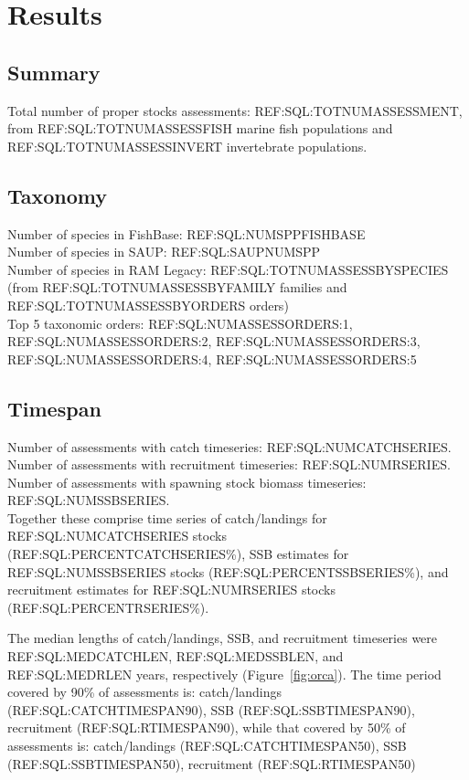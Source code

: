 \section*{Results}
\subsection*{Summary}
\noindent
Total number of proper stocks assessments: REF:SQL:TOTNUMASSESSMENT, from REF:SQL:TOTNUMASSESSFISH marine fish populations and REF:SQL:TOTNUMASSESSINVERT
invertebrate populations.

\subsection*{Taxonomy}
\noindent

Number of species in FishBase: REF:SQL:NUMSPPFISHBASE\\
Number of species in SAUP: REF:SQL:SAUPNUMSPP\\
Number of species in RAM Legacy: REF:SQL:TOTNUMASSESSBYSPECIES (from REF:SQL:TOTNUMASSESSBYFAMILY families and REF:SQL:TOTNUMASSESSBYORDERS orders) \\
Top 5 taxonomic orders: REF:SQL:NUMASSESSORDERS:1, REF:SQL:NUMASSESSORDERS:2, REF:SQL:NUMASSESSORDERS:3, REF:SQL:NUMASSESSORDERS:4, REF:SQL:NUMASSESSORDERS:5 \\

\subsection*{Timespan}
\noindent
Number of assessments with catch timeseries: REF:SQL:NUMCATCHSERIES.\\
Number of assessments with recruitment timeseries: REF:SQL:NUMRSERIES.\\
Number of assessments with spawning stock biomass timeseries: REF:SQL:NUMSSBSERIES.\\

Together these comprise time series of
catch/landings for REF:SQL:NUMCATCHSERIES stocks (REF:SQL:PERCENTCATCHSERIES\%),
SSB estimates for REF:SQL:NUMSSBSERIES stocks (REF:SQL:PERCENTSSBSERIES\%), and recruitment estimates for
REF:SQL:NUMRSERIES stocks (REF:SQL:PERCENTRSERIES\%).

The median lengths of catch/landings, SSB, and recruitment timeseries
were REF:SQL:MEDCATCHLEN, REF:SQL:MEDSSBLEN, and REF:SQL:MEDRLEN
years, respectively (Figure~\ref{fig:orca}).  The time period covered by 90\% of assessments
is: catch/landings (REF:SQL:CATCHTIMESPAN90), SSB
(REF:SQL:SSBTIMESPAN90), recruitment (REF:SQL:RTIMESPAN90), while that
covered by 50\% of assessments is: catch/landings
(REF:SQL:CATCHTIMESPAN50), SSB (REF:SQL:SSBTIMESPAN50), recruitment
(REF:SQL:RTIMESPAN50)
 
